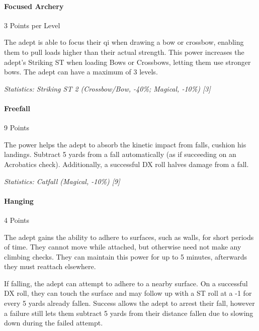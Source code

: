 \begin{multicols*}{3}
	\paragraph{Focused Archery}
	\begin{flushright}
		3 Points per Level
	\end{flushright}

	The adept is able to focus their qi when drawing a bow or crossbow, enabling them to pull loads higher than their actual strength. This power increases the adept's Striking ST when loading Bows or Crossbows, letting them use stronger bows. The adept can have a maximum of 3 levels.

	\textcolor{OliveGreen}{\textit{Statistics: Striking ST 2 (Crossbow/Bow, -40\%; Magical, -10\%) [3] }}

	\paragraph{Freefall}
	\begin{flushright}
		9 Points
	\end{flushright}

	The power helps the adept to absorb the kinetic impact from falls, cushion his landings. Subtract 5 yards from a fall automatically (as if succeeding on an Acrobatics check). Additionally, a successful DX roll halves damage from a fall.

	\textcolor{OliveGreen}{\textit{Statistics: Catfall (Magical, -10\%) [9]}}

	\paragraph{Hanging}
	\begin{flushright}
		4 Points
	\end{flushright}

	The adept gains the ability to adhere to surfaces, such as walls, for short periods of time. They cannot move while attached, but otherwise need not make any climbing checks. They can maintain this power for up to 5 minutes, afterwards they must reattach elsewhere.
	
	If falling, the adept can attempt to adhere to a nearby surface. On a successful DX roll, they can touch the surface and may follow up with a ST roll at a -1 for every 5 yards already fallen. Success allows the adept to arrest their fall, however a failure still lets them subtract 5 yards from their distance fallen due to slowing down during the failed attempt.
	

\end{multicols*}
